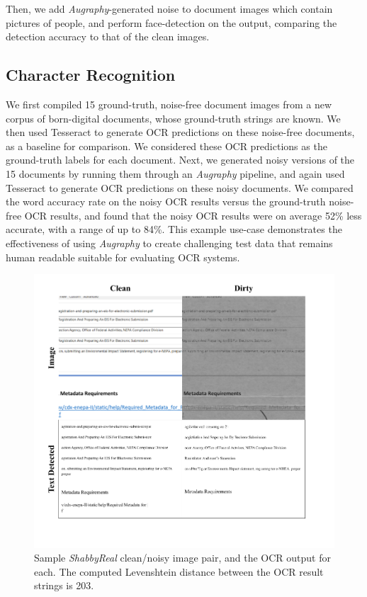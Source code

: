 \documentclass[runningheads]{llncs}
\begin{document}
Then, we add \emph{Augraphy}-generated noise to document images which contain pictures of people, and perform face-detection on the output, comparing the detection accuracy to that of the clean images.

\subsection{Character Recognition}
We first compiled 15 ground-truth, noise-free document images from a new corpus of born-digital documents, whose ground-truth strings are known. We then used Tesseract to generate OCR predictions on these noise-free documents, as a baseline for comparison. We considered these OCR predictions as the ground-truth labels for each document. Next, we generated noisy versions of the 15 documents by running them through an \emph{Augraphy} pipeline, and again used Tesseract to generate OCR predictions on these noisy documents. We compared the word accuracy rate on the noisy OCR results versus the ground-truth noise-free OCR results, and found that the noisy OCR results were on average 52\% less accurate, with a range of up to 84\%. This example use-case demonstrates the effectiveness of using \emph{Augraphy} to create challenging test data that remains human readable suitable for evaluating OCR systems.

\begin{figure}
\centering
\includegraphics[width=0.9\columnwidth, frame]{figures/ocr_figure.png}
\caption{Sample \emph{ShabbyReal} clean/noisy image pair, and the OCR output for each. The computed Levenshtein distance between the OCR result strings is 203.}
\label{fig:ocr_output}
\end{figure}
\end{document}
